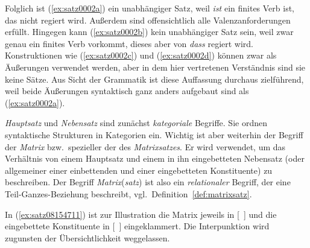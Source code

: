 Folglich ist (\ref{ex:satz0002a}) ein unabhängiger Satz, weil \textit{ist} ein finites Verb ist, das nicht regiert wird.
Außerdem sind offensichtlich alle Valenzanforderungen erfüllt.
Hingegen kann (\ref{ex:satz0002b}) kein unabhängiger Satz sein, weil zwar genau ein finites Verb vorkommt, dieses aber von \textit{dass} regiert wird.
Konstruktionen wie (\ref{ex:satz0002c}) und (\ref{ex:satz0002d}) können zwar als Äußerungen verwendet werden, aber in dem hier vertretenen Verständnis sind sie keine Sätze.
Aus Sicht der Grammatik ist diese Auffassung durchaus zielführend, weil beide Äußerungen syntaktisch ganz anders aufgebaut sind als (\ref{ex:satz0002a}).

\begin{exe}
  \ex\label{ex:satz0002} 
  \begin{xlist}
  \end{xlist}
\end{exe}

\textit{Hauptsatz} und \textit{Nebensatz} sind zunächst \textit{kategoriale} Begriffe.
Sie ordnen syntaktische Strukturen in Kategorien ein.
Wichtig ist aber weiterhin der Begriff der \textit{Matrix} bzw.\ spezieller der des \textit{Matrixsatzes}.
Er wird verwendet, um das Verhältnis von einem Hauptsatz und einem in ihn eingebetteten Nebensatz (oder allgemeiner einer einbettenden und einer eingebetteten Konstituente) zu beschreiben.
Der Begriff \textit{Matrix}(\textit{satz}) ist also ein \textit{relationaler} Begriff, der eine Teil-Ganzes-Beziehung beschreibt, vgl.\ Definition~\ref{def:matrixsatz}.


In (\ref{ex:satz08154711}) ist zur Illustration die Matrix jeweils in [~] und die eingebettete Konstituente in [~] eingeklammert.
Die Interpunktion wird zugunsten der Übersichtlichkeit weggelassen.

\begin{exe}
  \ex\label{ex:satz08154711} 
  \begin{xlist}
  \end{xlist}
\end{exe}

